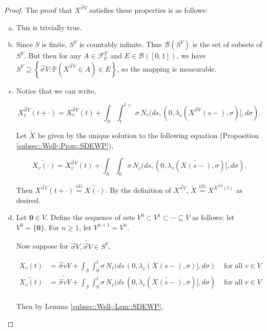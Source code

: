 \documentclass[12pt]{article}
\newcommand{\mb}{\mathbb}
\newcommand{\mc}{\mathcal}
\newcommand{\ms}{\mathscr}
\newcommand{\ov}{\overline}
\newcommand{\te}{\text}
\newcommand{\ind}{\hspace{24pt}}
\newcommand{\pr}{\mb{P}}							%
\newcommand{\deq}{\overset{\text{(d)}}{=}}			%
\renewcommand{\root}{\mathbf{0}}				%
\renewcommand{\v}{v}							%
\renewcommand{\U}{U}							%
\renewcommand{\S}{S}							%
\newcommand{\s}{\sigma}							%
\newcommand{\sv}{\vec{\s}}						%
\newcommand{\T}{T}								%
\renewcommand{\t}{t}							%
\newcommand{\cl}{\ov}							%
\newcommand{\poiss}[1]{N_{#1}}						%
\newcommand{\pup}[1]{^{#1}}							%
\newcommand{\V}{V}									%
\renewcommand{\tt}{s}								%
\newcommand{\numb}{n}								%
\newcommand{\XState}[1]{\S^{#1}}				%
\newcommand{\rxvt}[2]{X_{#1}{(#2)}}					%
\newcommand{\rxvtn}[3]{X_{#1}^{#3}(#2)}				%
\newcommand{\rxvts}[2]{X_{#1}{#2}}					%
\newcommand{\rxvtsn}[3]{X_{#1}^{#3}{#2}}			%
\newcommand{\rate}[1]{\lambda_{#1}}					%
\newcommand{\F}[2]{\mc{F}_{#1}^{#2}}				%
\newcommand{\alt}{\widetilde}						%
\begin{document}
\begin{proof}
The proof that \(\rxvtsn{}{}{\sv{}{\V}}\) satisfies these properties is as follows:

\begin{enumerate}[(a)]
\item This is trivially true.

\item Since \(\S\) is finite, \(\S^\V\) is countably infinite. Thus \(\ms{B}(\S^\V)\) is the set of subsets of \(\S^\V\). But then for any \(A \in \F{\U}{\T}\) and \(E \in \ms{B}([0,1])\), we have \(\S^\V \supseteq \left\{\sv{}{\V}: \pr\left(\rxvtsn{}{}{\sv{}{\V}} \in A\right) \in E\right\}\), so the mapping is measurable.

\item Notice that we can write,

\[\rxvtn{\v}{\t+\cdot}{\sv{}{\V}} = \rxvtn{\v}{\t}{\sv{}{\V}} + \int_\S\int_\t^{\t+\cdot} \s\,\poiss{\v}(d\tt,(0,\rate{\v}(\rxvtn{}{\tt-}{\sv{}{\V}},\s)],d\s).\]

Let \(\alt{\rxvts{}{}}\) be given by the unique solution to the following equation (Proposition \ref{subsec::Well-:Prop::SDEWP}),

\[\alt{\rxvt{\v}{\cdot}} = \rxvtn{\v}{\t}{\sv{}{\V}} + \int_\S \int_0^\cdot \s\,\poiss{\v}(d\tt,(0,\rate{\v}(\alt{\rxvt{}{\tt-}},\s)],d\s).\]

Then \(\rxvtn{}{\t+\cdot}{\sv{}{\V}} \deq \alt{\rxvt{}{\cdot}}\). By the definition of \(\rxvtsn{}{}{\sv{}{\V}}\), \(\alt{\rxvts{}{}} \deq \rxvtsn{}{}{\rxvtn{}{\t}{\sv{}{\V}}}\) as desired.

\item Let \(\root \in \V\). Define the sequence of sets \(\V\pup{0}\subset \V\pup{1}\subset \cdots \subseteq \V\) as follows: let \(\V\pup{0} = \{\root\}\). For \(\numb \geq 1\), let \(\V\pup{\numb+1} = \cl{\V\pup{\numb}}\).

\ind Now suppose for \(\sv{}{\V},\alt{\sv{}{\V}}\in \S^\V\),

\begin{align*}
\rxvt{\v}{\t} &= \sv{\v}{\V} + \int_\S\int_0^\t \s\,\poiss{\v}(d\tt\,(0,\rate{\v}(\rxvt{}{\tt-},\s)],d\s)&\te{ for all } \v \in \V\\
\alt{\rxvt{\v}{\t}} &= \alt{\sv{\v}{\V}} + \int_\S\int_0^\t \s\,\poiss{\v}(d\tt\,(0,\rate{\v}(\alt{\rxvt{}{\tt-}},\s)],d\s)&\te{ for all } \v \in \V\\
\end{align*}

Then by Lemma \ref{subsec::Well-:Lem::SDEWP},


\end{enumerate}
\end{proof}
\end{document}
